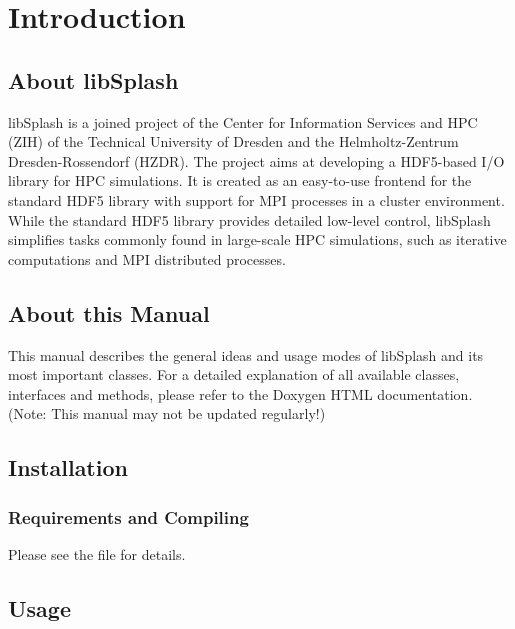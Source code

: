 \documentclass[a4paper,10pt,BCOR12mm]{report}
\begin{document}
\tableofcontents

\newpage


\chapter{Introduction}

\section{About libSplash}

libSplash is a joined project of the Center for Information Services and HPC (ZIH) of the
Technical University of Dresden and the Helmholtz-Zentrum Dresden-Rossendorf (HZDR).
The project aims at developing a HDF5-based I/O library for HPC simulations.
It is created as an easy-to-use frontend for the standard HDF5 library with support for MPI processes in a cluster environment.
While the standard HDF5 library provides detailed low-level control, libSplash simplifies
tasks commonly found in large-scale HPC simulations, such as iterative computations and MPI distributed processes.

\section{About this Manual}

This manual describes the general ideas and usage modes of libSplash and its most important classes.
For a detailed explanation of all available classes, interfaces and methods, please refer to the
Doxygen HTML documentation.
(Note: This manual may not be updated regularly!)

\newpage

\section{Installation}

\subsection{Requirements and Compiling}

Please see the file  for details.

\section{Usage}
\end{document}
